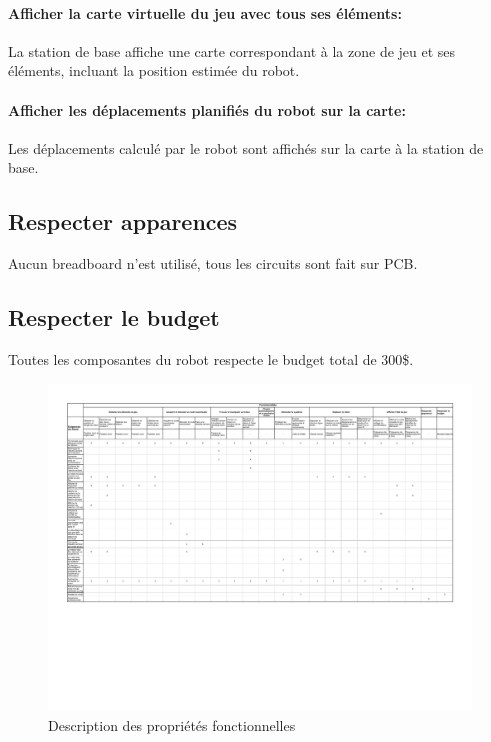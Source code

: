 \paragraph{Afficher la carte virtuelle du jeu avec tous ses éléments:}
La station de base affiche une carte correspondant à la zone de jeu et ses éléments, incluant la position estimée du robot.

\paragraph{Afficher les déplacements planifiés du robot sur la carte:}
Les déplacements calculé par le robot sont affichés sur la carte à la station de base.

\subsection{Respecter apparences}
Aucun breadboard n'est utilisé, tous les circuits sont fait sur PCB.

\subsection{Respecter le budget}
Toutes les composantes du robot respecte le budget total de 300\$.


\begin{landscape}
  \begin{center}
    \begin{figure}[h]
      \label{annexe_dpf}
      \centering
      \includegraphics[scale=0.85]{resources/dpf.pdf}
      \caption{Description des propriétés fonctionnelles}
    \end{figure}
  \end{center}
\end{landscape}